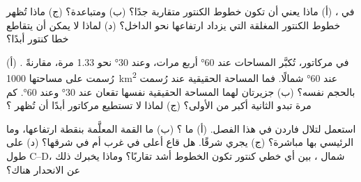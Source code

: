 \begin{exercise}[$\star$]\label{exo:g9:maps-of-the-earth:4}
في ، (أ) ماذا يعني أن تكون خطوط الكنتور متقاربة جدًا؟
(ب) ومتباعدة؟ (ج) ماذا تُظهر خطوط الكنتور المغلقة التي يزداد ارتفاعها نحو
الداخل؟ (د) لماذا لا يمكن أن يتقاطع خطا كنتور أبدًا؟
\end{exercise}

\begin{exercise}[$\star\star$]\label{exo:g9:maps-of-the-earth:5}
في  مركاتور، تُكبَّر المساحات عند  \ang{60} أربع مرات، وعند
 \ang{30} نحو 1.33 مرة، مقارنةً . (أ) رُسمت على 
 مساحتها \qty{1000}{km^2} عند \ang{60} شمالًا. فما المساحة الحقيقية
 عند  رُسمت بالحجم نفسه؟ (ب) جزيرتان لهما المساحة الحقيقية
نفسها تقعان عند \ang{30} وعند \ang{60}. كم مرة تبدو الثانية أكبر من
الأولى؟ (ج) لماذا لا تستطيع  مركاتور أبدًا أن تُظهر
؟
\end{exercise}

\begin{exercise}[$\star\star$]\label{exo:g9:maps-of-the-earth:6}
استعمل  لتلال فاردن في هذا الفصل. (أ) ما ؟ (ب) ما  القمة المعلَّمة بنقطة ارتفاعها، وما   الرئيسي  بها مباشرة؟ (ج) يجري  شرقًا. هل قاع 
أعلى في غرب  أم في شرقها؟ (د) على طول C--D، شمال ، بين أي
خطي كنتور تكون الخطوط أشد تقاربًا؟ وماذا يخبرك ذلك عن الانحدار
هناك؟
\end{exercise}

